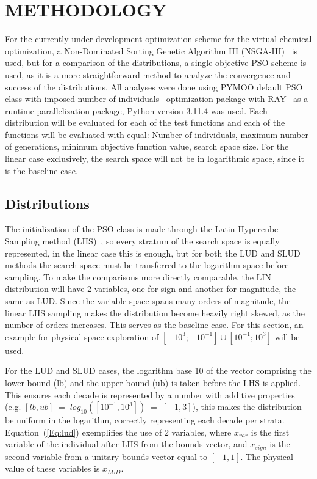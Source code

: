 \documentclass[10pt,fleqn,a4paper,twoside]{article}
\begin{document}
\section{METHODOLOGY}

For the currently under development optimization scheme for the virtual chemical optimization, a Non-Dominated Sorting Genetic Algorithm III (NSGA-III)~\citep{Deb2014} is used, but for a comparison of the distributions, a single objective PSO scheme is used, as it is a more straightforward method to analyze the convergence and success of the distributions.
All analyses were done using PYMOO default PSO class with imposed number of individuals~\citep{pymoo} optimization package with RAY~\citep{Ray2018} as a runtime parallelization package, Python version 3.11.4 was used. Each distribution will be evaluated
for each of the test functions and each of the functions will be evaluated with equal: Number of individuals, maximum number of generations, minimum objective function value,
search space size. For the linear case exclusively, the search space will not be in logarithmic space, since it is the baseline case.

\subsection{Distributions}
The initialization of the PSO class is made through the Latin Hypercube Sampling method (LHS)~\citep{McKay1979}, so every stratum of the search space is equally represented, in the linear case this is enough, but for both the 
LUD and SLUD methods the search space must be transferred to the logarithm space before sampling. To make the comparisons more directly comparable, the LIN distribution will have 2 variables, one for sign and another for 
magnitude, the same as LUD. Since the variable space spans many orders of magnitude, the linear LHS sampling makes the distribution become heavily right skewed, as the number of orders increases. This serves
as the baseline case. For this section, an example for physical space exploration of $[-10^3; -10^{-1}] \cup [10^{-1}; 10^{3}] $ will be used.

For the LUD and SLUD cases, the logarithm base 10 of the vector comprising the lower bound (lb) and the upper bound (ub) is taken before the LHS is applied. This ensures each decade is represented by a number with additive properties
(e.g. $[{lb, ub}] \;=\; log_{10}([10^{-1}, 10^{3}])\;=\; [-1,3]$), this makes the distribution be uniform in the logarithm, correctly representing each decade per strata. Equation~(\ref{Eq:lud})
exemplifies the use of 2 variables, where $x_{var}$ is the first variable of the individual after LHS from the bounds vector, and $x_{sign}$ is the second variable from a unitary bounds vector equal to 
$[-1, 1]$. The physical value of these variables is $x_{LUD}$.
\end{document}
